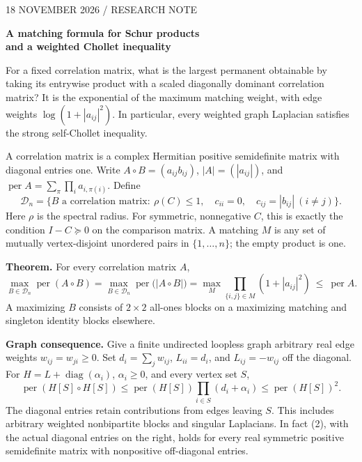 \documentclass[11pt]{article}
\newcommand{\shead}[1]{\par\vspace{4pt}{\large\bfseries\sffamily\color{ink}#1}\par}
\newcommand{\per}{\operatorname{per}}
\newcommand{\dd}{\mathcal D_n}
\begin{document}
{\small\sffamily\color{tone}18 NOVEMBER 2026 \quad / \quad RESEARCH NOTE}\par
{\LARGE\bfseries\sffamily\color{ink} A matching formula for Schur products\\[2pt] and a weighted Chollet inequality}\par
\vspace{5pt}
For a fixed correlation matrix, what is the largest permanent obtainable by taking its entrywise product with a scaled diagonally dominant correlation matrix? It is the exponential of the maximum matching weight, with edge weights $\log(1+|a_{ij}|^2)$. In particular, every weighted graph Laplacian satisfies the strong self-Chollet inequality.
\shead{1. Exact extremal statement}
A correlation matrix is a complex Hermitian positive semidefinite matrix with diagonal entries one. Write $A\circ B=(a_{ij}b_{ij})$, $|A|=(|a_{ij}|)$, and $\per A=\sum_\pi\prod_i a_{i,\pi(i)}$. Define
\[
  \dd=\{B\text{ a correlation matrix}:\ \rho(C)\le 1,
  \quad c_{ii}=0,\quad c_{ij}=|b_{ij}|\ (i\ne j)\}.
\]
Here $\rho$ is the spectral radius. For symmetric, nonnegative $C$, this is exactly the condition $I-C\succeq0$ on the comparison matrix. A matching $M$ is any set of mutually vertex-disjoint unordered pairs in $\{1,\ldots,n\}$; the empty product is one.
  
\textbf{Theorem.} For every correlation matrix $A$,
\begin{equation}
\max_{B\in\dd}\per(A\circ B)
=\max_{B\in\dd}\per\bigl(|A\circ B|\bigr)
=\max_M\prod_{\{i,j\}\in M}(1+|a_{ij}|^2)
\ \le\ \per A.
\end{equation}
A maximizing $B$ consists of $2\times2$ all-ones blocks on a maximizing matching and singleton identity blocks elsewhere.

\textbf{Graph consequence.} Give a finite undirected loopless graph arbitrary real edge weights $w_{ij}=w_{ji}\ge0$. Set $d_i=\sum_j w_{ij}$, $L_{ii}=d_i$, and $L_{ij}=-w_{ij}$ off the diagonal. For $H=L+\operatorname{diag}(\alpha_i)$, $\alpha_i\ge0$, and every vertex set $S$,
\begin{equation}
 \per(H[S]\circ H[S])\le \per(H[S])\prod_{i\in S}(d_i+\alpha_i)
 \le \per(H[S])^2.
\end{equation}
The diagonal entries retain contributions from edges leaving $S$. This includes arbitrary weighted nonbipartite blocks and singular Laplacians. In fact (2), with the actual diagonal entries on the right, holds for every real symmetric positive semidefinite matrix with nonpositive off-diagonal entries.
\end{document}
